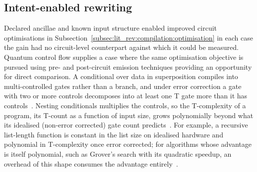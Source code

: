\subsection{Intent-enabled rewriting}\label{subsec:lit_rev:compilation:intent_rewriting}
Declared ancillae and known input structure enabled improved circuit optimisations in Subsection~\ref{subsec:lit_rev:compilation:optimisation} in each case the gain had no circuit-level counterpart against which it could be measured.
Quantum control flow supplies a case where the same optimisation objective is pursued using pre- and post-circuit emission techniques providing an opportunity for direct comparison.
A conditional over data in superposition compiles into multi-controlled gates rather than a branch, and under error correction a gate with two or more controls decomposes into at least one T gate more than it has controls~\cite{yuan2025foundationalabstractions}.
Nesting conditionals multiplies the controls, so the T-complexity of a program, its T-count as a function of input size, grows polynomially beyond what its idealised (non-error corrected) gate count predicts~\cite{yuan2025foundationalabstractions}.
For example, a recursive list-length function is constant in the list size on idealised hardware and polynomial in T-complexity once error corrected; for algorithms whose advantage is itself polynomial, such as Grover's search with its quadratic speedup, an overhead of this shape consumes the advantage entirely~\cite{yuan2025foundationalabstractions}.

